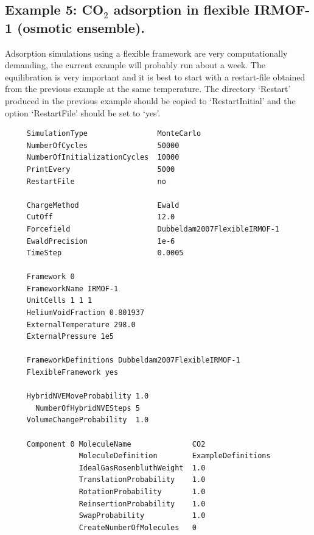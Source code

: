 \subsection*{Example 5: CO$_2$ adsorption in flexible IRMOF-1 (osmotic ensemble).}

Adsorption simulations using a flexible framework are very computationally demanding, the current example will 
probably run about a week. The equilibration is very important and it is best to start with a restart-file
obtained from the previous example at the same temperature. The directory `Restart' produced in the previous
example should be copied to `RestartInitial' and the option `RestartFile' should be set to `yes'.

\begin{tiny}
\begin{verbatim}
     SimulationType                MonteCarlo
     NumberOfCycles                50000
     NumberOfInitializationCycles  10000
     PrintEvery                    5000
     RestartFile                   no
     
     ChargeMethod                  Ewald
     CutOff                        12.0
     Forcefield                    Dubbeldam2007FlexibleIRMOF-1
     EwaldPrecision                1e-6
     TimeStep                      0.0005
     
     Framework 0
     FrameworkName IRMOF-1
     UnitCells 1 1 1
     HeliumVoidFraction 0.801937
     ExternalTemperature 298.0
     ExternalPressure 1e5
     
     FrameworkDefinitions Dubbeldam2007FlexibleIRMOF-1
     FlexibleFramework yes
     
     HybridNVEMoveProbability 1.0
       NumberOfHybridNVESteps 5
     VolumeChangeProbability  1.0
     
     Component 0 MoleculeName              CO2
                 MoleculeDefinition        ExampleDefinitions
                 IdealGasRosenbluthWeight  1.0
                 TranslationProbability    1.0
                 RotationProbability       1.0
                 ReinsertionProbability    1.0
                 SwapProbability           1.0
                 CreateNumberOfMolecules   0
\end{verbatim}
\end{tiny}


